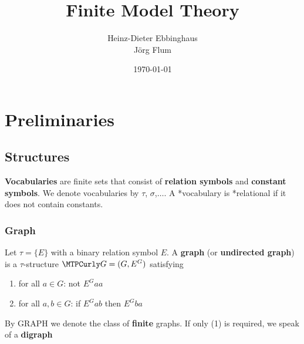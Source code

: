 \documentclass[11pt]{article}
\author{Heinz-Dieter Ebbinghaus\\Jörg Flum}
\date{\today}
\title{Finite Model Theory}
\begin{document}
\maketitle
\tableofcontents \clearpage

\section{Preliminaries}
\label{sec:org2cb1e5b}

\subsection{Structures}
\label{sec:org4b5df33}
\textbf{Vocabularies} are finite sets that consist of \textbf{relation symbols} and
\textbf{constant symbols}. We denote vocabularies by \(\tau\), \(\sigma\),\(\dots\). A
*vocabulary is *relational if it does not contain constants.


\subsubsection{Graph}
\label{sec:org65099a5}
Let \(\tau=\{E\}\) with a binary relation symbol \(E\). A \textbf{graph} (or
\textbf{undirected graph}) is a \(\tau\)-structure \(\calg=(G,E^G)\) satisfying
\begin{enumerate}
\item for all \(a\in G\): not \(E^Gaa\)
\item for all \(a,b\in G\): if \(E^Gab\) then \(E^Gba\)
\end{enumerate}


By GRAPH we denote the class of \textbf{finite} graphs. If only (1) is required, we
speak of a \textbf{digraph}
\end{document}
